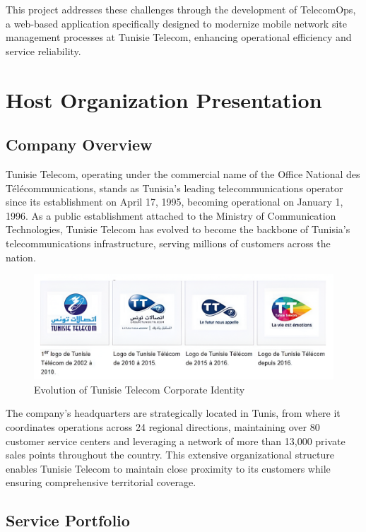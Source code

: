 This project addresses these challenges through the development of TelecomOps, a web-based application specifically designed to modernize mobile network site management processes at Tunisie Telecom, enhancing operational efficiency and service reliability.

\section{Host Organization Presentation}

\subsection{Company Overview}

Tunisie Telecom, operating under the commercial name of the Office National des Télécommunications, stands as Tunisia's leading telecommunications operator since its establishment on April 17, 1995, becoming operational on January 1, 1996. As a public establishment attached to the Ministry of Communication Technologies, Tunisie Telecom has evolved to become the backbone of Tunisia's telecommunications infrastructure, serving millions of customers across the nation.

\begin{figure}[H]
    \centering
    \includegraphics[width=0.8\columnwidth]{img/company/logos_update.png}
    \caption{Evolution of Tunisie Telecom Corporate Identity}
    \label{fig:tt_logos}
\end{figure}

The company's headquarters are strategically located in Tunis, from where it coordinates operations across 24 regional directions, maintaining over 80 customer service centers and leveraging a network of more than 13,000 private sales points throughout the country. This extensive organizational structure enables Tunisie Telecom to maintain close proximity to its customers while ensuring comprehensive territorial coverage.

\subsection{Service Portfolio}

